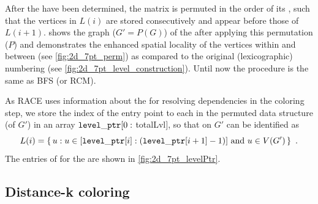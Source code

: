 
After the \levels have been determined, the matrix is permuted in the
order of its \levels, such that the vertices in $L(i)$ are stored
consecutively and appear before those of
$L(i+1)$.  shows the graph ($G' = P(G)$)
of the \stex after applying this permutation ($P$) and demonstrates
the enhanced spatial locality of the vertices within and between
\levels (see \cref{fig:2d_7pt_perm}) as compared to the original
(lexicographic) numbering (see \cref{fig:2d_7pt_level_construction}).
Until now the procedure is the same as \acrshort{BFS} (or
\acrshort{RCM}).

As \acrshort{RACE} uses information about the \levels for resolving
dependencies in the coloring step, we store the index of the entry point to each
\level in the permuted data structure (of $G'$) in an array
${\tt level\_ptr}[0:$ \acrshort{totalLvl}$]$, so that \levels on $G'$ can be
identified as
\begin{equation*}
  L(i) = \set{ u : u \in [{\tt level\_ptr} [i]:({\tt level\_ptr} [i+1]-1)]
    \text{ and } u \in V(G')}~.
\end{equation*}
The entries of \levelPtr for the \stex are shown in \cref{fig:2d_7pt_levelPtr}. 
 
\subsection{Distance-k coloring} \label{subsec:DK}

